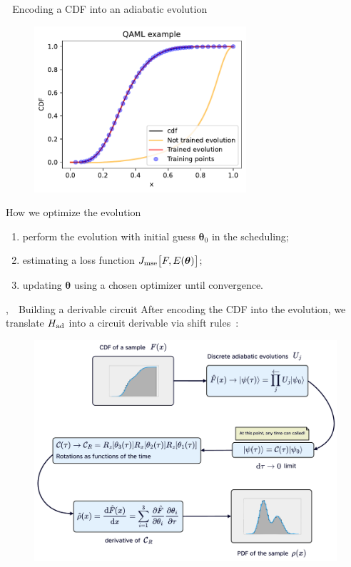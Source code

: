 \documentclass[20pt, final]{beamer}
\newlength{\colwidth}
\begin{document}
\begin{frame}[t]
\begin{columns}[t]
\begin{column}{\colwidth}
\begin{block}{\faChain\,\, Encoding a CDF into an adiabatic evolution}
\begin{figure}
    \includegraphics[width=0.7\textwidth]{figures/evolution.pdf}
\end{figure}
\end{block}

  \begin{alertblock}{How we optimize the evolution}
  
  \begin{enumerate}
    \item perform the evolution with initial guess $\bm{\theta}_0$ in the scheduling;
    \item estimating a loss function $J_{\rm mse}\bigl[F, E(\bm{\theta})\bigr]$;
    \item updating $\bm{\theta}$ using a chosen optimizer until convergence.
  \end{enumerate}

  \end{alertblock}
  

  \begin{block}{\faPencil, \faCogs\,\, Building a derivable circuit}
  After encoding the CDF into the evolution, we translate $H_{\rm ad}$ into a circuit
derivable via shift rules~\cite{Schuld_2019}:
  \begin{figure}
    \includegraphics[width=1\textwidth]{figures/cdf2pdf.pdf}
  \end{figure}
  \end{block}


\end{column}
\end{columns}
\end{frame}
\end{document}
